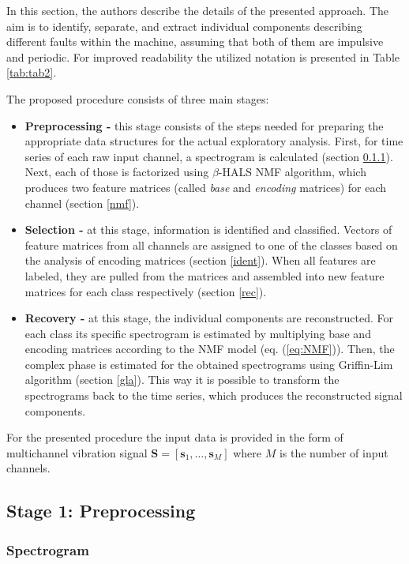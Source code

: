 \documentclass[3p,12pt]{elsarticle}
\begin{document}
In this section, the authors describe the details of the presented approach. The aim is to identify, separate, and extract individual components describing different faults within the machine, assuming that both of them are impulsive and periodic. For improved readability the utilized notation is presented in Table \ref{tab:tab2}.

The proposed procedure consists of three main stages:

\begin{itemize}
    \item \textbf{Preprocessing -} this stage consists of the steps needed for preparing the appropriate data structures for the actual exploratory analysis. First, for time series of each raw input channel, a spectrogram is calculated (section \ref{sec_spec}). Next, each of those is factorized using $\beta$-HALS NMF algorithm, which produces two feature matrices (called \emph{base} and \emph{encoding} matrices) for each channel (section \ref{nmf}).
    \item \textbf{Selection -} at this stage, information is identified and classified. Vectors of feature matrices from all channels are assigned to one of the classes based on the analysis of encoding matrices (section \ref{ident}). When all features are labeled, they are pulled from the matrices and assembled into new feature matrices for each class respectively (section \ref{rec}).
    \item \textbf{Recovery -} at this stage, the individual components are reconstructed. For each class its specific spectrogram is estimated by multiplying base and encoding matrices according to the NMF model (eq. (\ref{eq:NMF})). Then, the complex phase is estimated for the obtained spectrograms using Griffin-Lim algorithm (section \ref{gla}). This way it is possible to transform the spectrograms back to the time series, which produces the reconstructed signal components.
\end{itemize}

For the presented procedure the input data is provided in the form of multichannel vibration signal $\mathbf{S}=[\mathbf{s}_1,\dots,\mathbf{s}_M]$ where $M$ is the number of input channels.

\subsection{Stage 1: Preprocessing}

\subsubsection{Spectrogram}\label{sec_spec}
\end{document}
